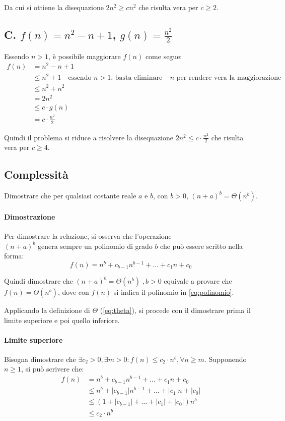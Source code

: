\documentclass{article}
\begin{document}
Da cui si ottiene la disequazione $2n^2 \geq cn^2$ che risulta vera per $c \geq 2$.

\subsection*{C. $f(n) = n^2 - n + 1$, $g(n) = \frac{n^2}{2}$}
Essendo $n > 1$, è possibile maggiorare $f(n)$ come segue:
\begin{align*}
    f(n) &= n^2 - n + 1\\
  &\leq n^2 +1 \quad \text{essendo $n > 1$, basta eliminare $-n$ per rendere vera la maggiorazione}\\
  &\leq n^2 + n^2 \\
  &= 2n^2\\
  &\leq c\cdot g(n) \\
  &=c \cdot \frac{n^2}{2}
\end{align*}

Quindi il problema si riduce a risolvere la disequazione $2n^2 \leq c\cdot \frac{n^2}{2}$ che risulta vera per $c \geq 4 $.

\clearpage
\subsection{Complessità}
Dimostrare che per qualsiasi costante reale $a$ e $b$, con $b > 0$, $(n+a)^b = \Theta(n^b)$.\\
\paragraph{Dimostrazione}
Per dimostrare la relazione, si osserva che l'operazione\\ $(n+a)^b$ genera sempre un polinomio di grado $b$ che può essere scritto nella forma:
\begin{equation}
    f(n) = n^b + c_{b-1}n^{b-1}+\ldots+c_1n+c_0
    \label{eq:polinomio}
\end{equation}

Quindi dimostrare che $(n+a)^b = \Theta(n^b)\;,b > 0$ equivale a provare che $f(n)= \Theta(n^b)$, dove con $f(n)$ si indica il polinomio in \cref{eq:polinomio}.

Applicando la definizione di $\Theta$ (\cref{eq:theta}), si procede con il dimostrare prima il limite superiore e poi quello inferiore.

\paragraph{Limite superiore} Bisogna dimostrare che $\exists c_2 > 0, \exists m > 0: f(n) \leq c_2\cdot n^b, \forall n \geq m$. Supponendo $n \geq 1$, si può scrivere che:
\begin{align*}
    f(n)&= n^b+c_{b-1}n^{b-1}+\ldots+c_1n+c_0\\
    &\leq n^b+|c_{b-1}|n^{b-1}+\ldots+|c_1|n+|c_0|\\
    &\leq (1+|c_{b-1}|+\ldots+|c_1|+|c_0|)n^b\\
    &\leq c_2\cdot n^b
\end{align*}
\end{document}
